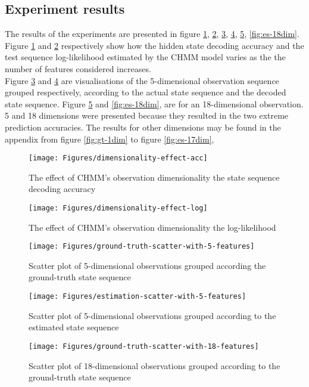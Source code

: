 \subsection{Experiment results}
The results of the experiments are presented in figure \ref{fig:dim-acc}, \ref{fig:dim-log}, \ref{fig:gt-5dim}, \ref{fig:es-5dim}, \ref{fig:gt-18dim}, \ref{fig:es-18dim}.\\
Figure \ref{fig:dim-acc} and \ref{fig:dim-log} respectively show how the hidden state decoding accuracy and the test sequence log-likelihood estimated by the CHMM model varies as the the number of features considered increases.\\
Figure \ref{fig:gt-5dim} and \ref{fig:es-5dim} are visualisations of the 5-dimensional observation sequence grouped respectively, according to the actual state sequence and the decoded state sequence. Figure \ref{fig:gt-18dim} and \ref{fig:es-18dim}, are for an 18-dimensional observation.
5 and 18 dimensions were presented because they resulted in the two extreme prediction accuracies. The results for other dimensions may be found in the appendix from figure \ref{fig:gt-1dim} to figure \ref{fig:es-17dim}, %
\begin{figure}[ht!]
	\centering
	\texttt{[image: Figures/dimensionality-effect-acc]}
	\caption{The effect of CHMM's observation dimensionality the state sequence decoding accuracy}
	\label{fig:dim-acc}
\end{figure}

\begin{figure}[ht!]
	\texttt{[image: Figures/dimensionality-effect-log]}
	\caption{The effect of CHMM's observation dimensionality the log-likelihood}
	\label{fig:dim-log}
\end{figure}


\begin{figure}[ht!]
	\texttt{[image: Figures/ground-truth-scatter-with-5-features]}
	\caption{Scatter plot of  5-dimensional observations grouped according the ground-truth state sequence}
	\label{fig:gt-5dim}
\end{figure}
\begin{figure}[ht!]
	\texttt{[image: Figures/estimation-scatter-with-5-features]}
	\caption{Scatter plot of 5-dimensional observations grouped according to the estimated state sequence}
	\label{fig:es-5dim}
\end{figure}

\begin{figure}[ht!]
	\texttt{[image: Figures/ground-truth-scatter-with-18-features]}
	\caption{Scatter plot of 18-dimensional observations grouped according to the ground-truth state sequence}
	\label{fig:gt-18dim}
\end{figure}

